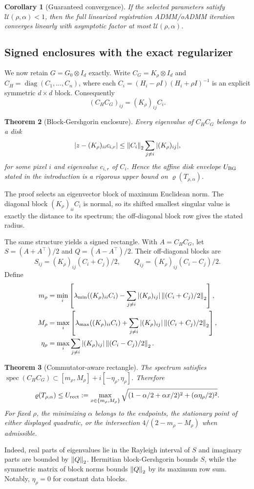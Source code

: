 \documentclass[pdflatex,iicol,sn-mathphys-num]{sn-jnl}
\newtheorem{theorem}{Theorem}[section]
\newtheorem{corollary}[theorem]{Corollary}\newtheorem{assumption}[theorem]{Assumption}
\theoremstyle{definition}\newtheorem{definition}[theorem]{Definition}\newtheorem{remark}[theorem]{Remark}
\newcommand{\spec}{\operatorname{spec}}\newcommand{\spr}{\varrho}\newcommand{\diag}{\operatorname{diag}}
\begin{document}
\begin{corollary}[Guaranteed convergence]\label{cor:convergence}
If the selected parameters satisfy $\mathcal U(\rho,\alpha)<1$, then the full linearized registration ADMM/oADMM iteration converges linearly with asymptotic factor at most $\mathcal U(\rho,\alpha)$.
\end{corollary}

\subsection{Signed enclosures with the exact regularizer}
We now retain $G=G_0\otimes I_d$ exactly.  Write $C_G=K_\rho\otimes I_d$ and $C_H=\operatorname{diag}(C_1,\ldots,C_n)$, where each $C_i=(H_i-\rho I)(H_i+\rho I)^{-1}$ is an explicit symmetric $d\times d$ block.  Consequently
\[
(C_HC_G)_{ij}=(K_\rho)_{ij}C_i.
\]

\begin{theorem}[Block-Gershgorin enclosure]\label{thm:block_gershgorin}
Every eigenvalue of $C_HC_G$ belongs to a disk
\[
 |z-(K_\rho)_{ii}c_{i,r}|\le
 \left\lVert C_i\right\rVert_2\sum_{j\ne i}|(K_\rho)_{ij}|,
\]
for some pixel $i$ and eigenvalue $c_{i,r}$ of $C_i$.  Hence the affine disk envelope $U_{\rm BG}$ stated in the introduction is a rigorous upper bound on $\spr(T_{\rho,\alpha})$.
\end{theorem}
The proof selects an eigenvector block of maximum Euclidean norm.  The diagonal block $(K_\rho)_{ii}C_i$ is normal, so its shifted smallest singular value is exactly the distance to its spectrum; the off-diagonal block row gives the stated radius.

The same structure yields a signed rectangle.  With $A=C_HC_G$, let $S=(A+A^\top)/2$ and $Q=(A-A^\top)/2$.  Their off-diagonal blocks are
\[
 S_{ij}=(K_\rho)_{ij}(C_i+C_j)/2,\qquad
 Q_{ij}=(K_\rho)_{ij}(C_i-C_j)/2.
\]
Define
\begin{align*}
m_\rho&=\min_i\left[\lambda_{\min}((K_\rho)_{ii}C_i)-\sum_{j\ne i}|(K_\rho)_{ij}|\left\lVert (C_i+C_j)/2\right\rVert_2\right],\\
M_\rho&=\max_i\left[\lambda_{\max}((K_\rho)_{ii}C_i)+\sum_{j\ne i}|(K_\rho)_{ij}|\left\lVert (C_i+C_j)/2\right\rVert_2\right],\\
\eta_\rho&=\max_i\sum_{j\ne i}|(K_\rho)_{ij}|\left\lVert (C_i-C_j)/2\right\rVert_2.
\end{align*}

\begin{theorem}[Commutator-aware rectangle]\label{thm:rectangle}
The spectrum satisfies $\spec(C_HC_G)\subset[m_\rho,M_\rho]+i[-\eta_\rho,\eta_\rho]$.  Therefore
\[
\spr(T_{\rho,\alpha})\le U_{\rm rect}:=
\max_{x\in\{m_\rho,M_\rho\}}
\sqrt{(1-\alpha/2+\alpha x/2)^2+(\alpha\eta_\rho/2)^2}.
\]
For fixed $\rho$, the minimizing $\alpha$ belongs to the endpoints, the stationary point of either displayed quadratic, or the intersection $4/(2-m_\rho-M_\rho)$ when admissible.
\end{theorem}
Indeed, real parts of eigenvalues lie in the Rayleigh interval of $S$ and imaginary parts are bounded by $\left\lVert Q\right\rVert_2$.  Hermitian block-Gershgorin bounds $S$, while the symmetric matrix of block norms bounds $\left\lVert Q\right\rVert_2$ by its maximum row sum.  Notably, $\eta_\rho=0$ for constant data blocks.
\end{document}
